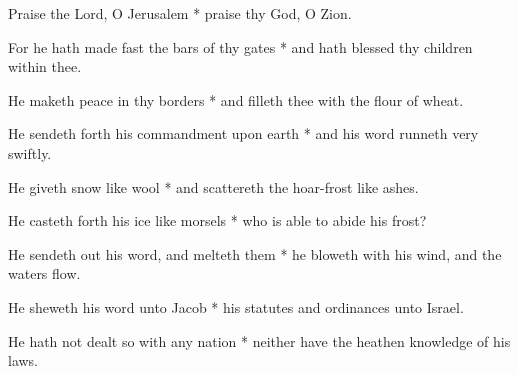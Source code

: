 \begin{multicols}{2}
	
	Praise the Lord, O Jerusalem * praise thy God, O Zion.
	
	For he hath made fast the bars of thy gates * and hath blessed thy children within thee.
	
	He maketh peace in thy borders * and filleth thee with the flour of wheat.
	
	He sendeth forth his commandment upon earth * and his word runneth very swiftly.
	
	He giveth snow like wool * and scattereth the hoar-frost like ashes.
	
	He casteth forth his ice like morsels * who is able to abide his frost?
	
	He sendeth out his word, and melteth them * he bloweth with his wind, and the waters flow.
	
	He sheweth his word unto Jacob * his statutes and ordinances unto Israel.
	
	He hath not dealt so with any nation * neither have the heathen knowledge of his laws.
	
	\gloria{}
\end{multicols}